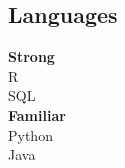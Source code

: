 \documentclass[letterpaper]{deedy-resume} %
\begin{document}
\begin{minipage}[t]{0.3\textwidth}
  \sectionspace %
  \vspace{3pt}
  \subsection{Languages}
  {\bf Strong\\}
  R\\
  SQL\\
  \vspace{4pt}
  {\bf{Familiar\\}}
  Python\\
  Java\\
  \vspace{4pt}


\end{minipage} %
\hfill
% 
% 
\end{document}
